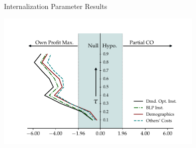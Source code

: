 \documentclass[xcolor=pdftex,dvipsnames,table,mathserif,aspectratio=169]{beamer}
\begin{document}
\begin{frame}[plain]{Internalization Parameter Results}
\begin{center}
\includegraphics[width=10cm]{resources/tau_figure2.pdf}
\end{center}
\end{frame}


\end{document}
